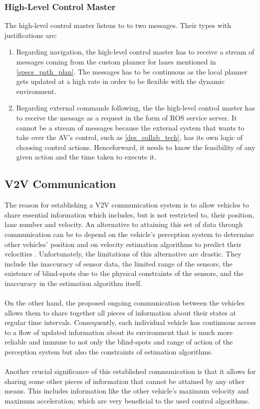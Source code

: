 \subsubsection{High-Level Control Master}
\label{des_high_lvl_cntrl}
The high-level control master listens to to two messages. Their types with justifications are:
\begin{enumerate}
    \item Regarding navigation, the high-level control master has to receive a stream of messages coming from the custom planner for lanes mentioned in \ref{specs_path_plan}. The messages has to be continuous as the local planner gets updated at a high rate in order to be flexible with the dynamic environment. 
    \item Regarding external commands following, the the high-level control master has to receive the message as a request in the form of ROS service server. It cannot be a stream of messages because the external system that wants to take over the AV's control, such as \ref{des_collab_tech}, has its own logic of choosing control actions. Henceforward, it needs to know the feasibility of any given action and the time taken to execute it.  
\end{enumerate}

\subsection{V2V Communication}
\label{des_v2v_comm}
The reason for establishing a V2V communication system is to allow vehicles to share essential information which includes, but is not restricted to, their position, lane number and velocity. An alternative to attaining this set of data through communication can be to depend on the vehicle’s perception system to determine other vehicles’ position and on velocity estimation algorithms to predict their velocities \cite{estimationalg}. Unfortunately, the limitations of this alternative are drastic. They include the inaccuracy of sensor data, the limited range of the sensors, the existence of blind-spots due to the physical constraints of the sensors, and the inaccuracy in the estimation algorithm itself.
\\ \\
On the other hand, the proposed ongoing communication between the vehicles allows them to share together all pieces of information about their states at regular time intervals. Consequently, each individual vehicle has continuous access to a flow of updated information about its environment that is much more reliable and immune to not only the blind-spots and range of action of the perception system but also the constraints of estimation algorithms.
\\ \\
Another crucial significance of this established communication is that it allows for sharing some other pieces of information that cannot be attained by any other means. This includes information like the other vehicle’s maximum velocity and maximum acceleration; which are very beneficial to the used control algorithms.

